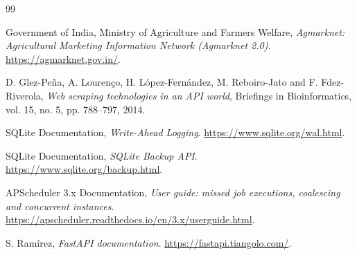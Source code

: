 \documentclass[12pt,a4paper,oneside]{report}
\numberwithin{equation}{chapter}
\numberwithin{figure}{chapter}
\numberwithin{table}{chapter}
\theoremstyle{definition}
\begin{document}
\begin{thebibliography}{99}

Government of India, Ministry of Agriculture and Farmers Welfare,
\emph{Agmarknet: Agricultural Marketing Information Network (Agmarknet 2.0)}.
\url{https://agmarknet.gov.in/}.

D. Glez-Pe\~na, A. Louren\c{c}o, H. L\'opez-Fern\'andez, M. Reboiro-Jato and F. Fdez-Riverola,
\emph{Web scraping technologies in an API world},
Briefings in Bioinformatics, vol. 15, no. 5, pp. 788--797, 2014.

SQLite Documentation, \emph{Write-Ahead Logging}.
\url{https://www.sqlite.org/wal.html}.

SQLite Documentation, \emph{SQLite Backup API}.
\url{https://www.sqlite.org/backup.html}.

APScheduler 3.x Documentation, \emph{User guide: missed job executions, coalescing and concurrent instances}.
\url{https://apscheduler.readthedocs.io/en/3.x/userguide.html}.

S. Ram\'irez, \emph{FastAPI documentation}.
\url{https://fastapi.tiangolo.com/}.

\end{thebibliography}
\end{document}
